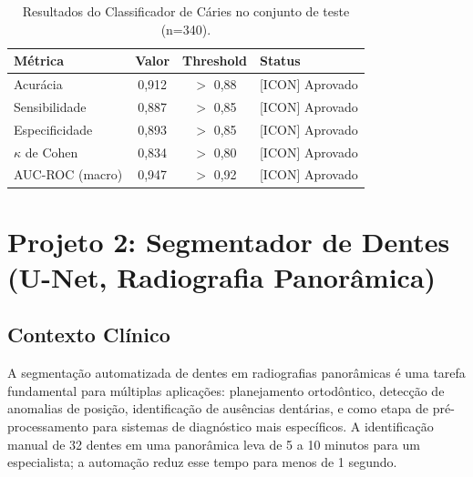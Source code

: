 \begin{table}[H]
  \centering
  \caption{Resultados do Classificador de Cáries no conjunto de teste (n=340).}
  \label{tab:caries-results}
  \begin{tabularx}{\textwidth}{lccX}
    \toprule
    \textbf{Métrica} & \textbf{Valor} & \textbf{Threshold} & \textbf{Status} \\
    \midrule
    Acurácia & 0,912 & $>$ 0,88 & \textcolor{corTesteSucesso}{[ICON] Aprovado} \\
    Sensibilidade & 0,887 & $>$ 0,85 & \textcolor{corTesteSucesso}{[ICON] Aprovado} \\
    Especificidade & 0,893 & $>$ 0,85 & \textcolor{corTesteSucesso}{[ICON] Aprovado} \\
    $\kappa$ de Cohen & 0,834 & $>$ 0,80 & \textcolor{corTesteSucesso}{[ICON] Aprovado} \\
    AUC-ROC (macro) & 0,947 & $>$ 0,92 & \textcolor{corTesteSucesso}{[ICON] Aprovado} \\
    \bottomrule
  \end{tabularx}
\end{table}


\section{Projeto 2: Segmentador de Dentes (U-Net, Radiografia Panorâmica)}

\subsection{Contexto Clínico}

A segmentação automatizada de dentes em radiografias panorâmicas é uma
tarefa fundamental para múltiplas aplicações: planejamento ortodôntico,
detecção de anomalias de posição, identificação de ausências dentárias,
e como etapa de pré-processamento para sistemas de diagnóstico mais
específicos. A identificação manual de 32 dentes em uma panorâmica leva
de 5 a 10 minutos para um especialista; a automação reduz esse tempo
para menos de 1 segundo.

  

